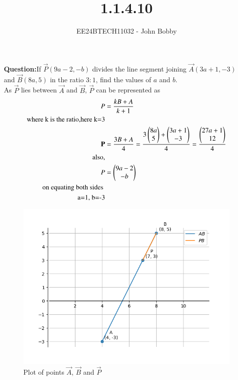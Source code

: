 \documentclass[journal]{IEEEtran}
\begin{document}

\vspace{3cm}
\title{1.1.4.10}
\author{EE24BTECH11032 - John Bobby}
{\let\newpage\relax\maketitle}

\renewcommand{\thefigure}{\theenumi}
\renewcommand{\thetable}{\theenumi}
\setlength{\intextsep}{10pt} %


\renewcommand{\thetable}{\theenumi}

\textbf{Question:}If $\vec{P}(9a-2,-b)$ divides the line segment joining $\vec{A}(3a+1,-3)$ and $\vec{B}(8a,5)$  
		in the ratio $3:1$, find the values of $a$ and $b$.\\
 
		\solution As $\vec{P}$ lies between $\vec{A}$ and $\vec{B}$, $\vec{P}$ can be represented as\\ 
		\begin{align}
			P &=\frac{kB+A}{k+1}\\ 
			\text{where k is the ratio,here k=3}\\
			\mathbf{P} &=\frac{3B+A}{4}=\frac{3\begin{pmatrix}8a\\5\end{pmatrix}+\begin{pmatrix}3a+1\\-3\end{pmatrix}}{4}=\frac{\begin{pmatrix}27a+1\\12\end{pmatrix}}{4}\\
			\text{also,}\\
			P &=\begin{pmatrix}9a-2\\-b\end{pmatrix}\\
			\text{on equating both sides }\\
			\text{a=1, b=-3}
		\end{align}
\begin{figure}[h!]
                \centering
               \includegraphics[width=0.7\linewidth]{Figs/Fig1.png}
			\caption{Plot of points $\vec{A}$, $\vec{B}$ and $\vec{P}$}
               \label{stemplot}
               \end{figure}
\end{document}
